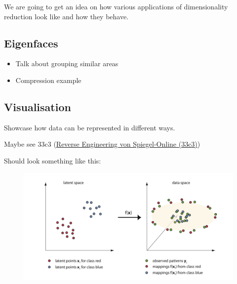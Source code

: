 We are going to get an idea on how various applications of dimensionality reduction look like and how they behave.







\subsection{Eigenfaces}

\begin{itemize}
  \item Talk about grouping similar areas
  \item Compression example
\end{itemize}

\clearpage





\subsection{Visualisation}

Showcase how data can be represented in different ways.

Maybe see 33c3 (\href{https://www.youtube.com/watch?v=-YpwsdRKt8Q}{Reverse Engineering von Spiegel-Online (33c3)})

Should look something like this:

\begin{figure}[h]
  \centering
  \includegraphics[width=0.9\linewidth]{external_content/graphs/latent_space_reduction_example.png}
  \captionsetup{justification=centering}
  \label{fig:visualisingReduction}
\end{figure}


\clearpage


